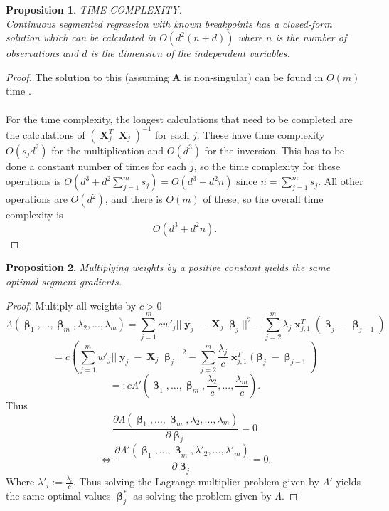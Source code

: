 \documentclass[12pt]{article}
\DeclareMathOperator{\bx}{\mathbf{x}}
\DeclareMathOperator{\bX}{\mathbf{X}}
\DeclareMathOperator{\by}{\mathbf{y}}
\DeclareMathOperator{\bbeta}{\boldsymbol{\beta}}
\newtheorem{prop}{Proposition}
\begin{document}
\begin{prop}
TIME COMPLEXITY. \\
Continuous segmented regression with known breakpoints has a closed-form solution which can be calculated in $O(d^2(n+d))$ where $n$ is the number of observations and $d$ is the dimension of the independent variables.
\end{prop}
\begin{proof}
The solution to this (assuming $\mathbf{A}$ is non-singular) can be found in $O(m)$ time \cite{tridiagonal}. \\ \\
For the time complexity, the longest calculations that need to be completed are the calculations of $(\bX_j^T\bX_j)^{-1}$ for each $j$. These have time complexity $O(s_jd^2)$ for the multiplication and $O(d^3)$ for the inversion. This has to be done a constant number of times for each $j$, so the time complexity for these operations is $O(d^3+d^2\sum_{j=1}^ms_j) = O(d^3+d^2n)$ since $n=\sum_{j=1}^m s_j$. All other operations are $O(d^2)$, and there is $O(m)$ of these, so the overall time complexity is 
$$O(d^3+d^2n).$$
\end{proof}

\begin{prop}
Multiplying weights by a positive constant yields the same optimal segment gradients.
\end{prop}
\begin{proof}
Multiply all weights by $c>0$
$$\Lambda(\bbeta_1,...,\bbeta_m,\lambda_2,...,\lambda_m) =  \sum_{j=1}^m cw'_j||\by_j-\bX_j\bbeta_j||^2-\sum_{j=2}^m\lambda_j\bx_{j, 1}^T (\bbeta_j - \bbeta_{j-1})$$
$$=c\left(\sum_{j=1}^m w'_j||\by_j-\bX_j\bbeta_j||^2-\sum_{j=2}^m\frac{\lambda_j}{c}\bx_{j, 1}^T (\bbeta_j - \bbeta_{j-1} \right)$$
$$=:c\Lambda' \left(\bbeta_1,...,\bbeta_m,\frac{\lambda_2}{c},...,\frac{\lambda_m}{c}\right).$$
Thus 
$$\frac{\partial \Lambda(\bbeta_1,...,\bbeta_m,\lambda_2,...,\lambda_m)}{\partial \bbeta_j} = 0$$
$$\iff \frac{\partial \Lambda' \left(\bbeta_1,...,\bbeta_m,\lambda'_2,...,\lambda'_m \right)}{\partial \bbeta_j}=0.$$
Where $\lambda'_i := \frac{\lambda_i}{c}$.
Thus solving the Lagrange multiplier problem given by $\Lambda'$ yields the same optimal values $\bbeta^*_j$ as solving the problem given by $\Lambda$.
\end{proof}
\end{document}

